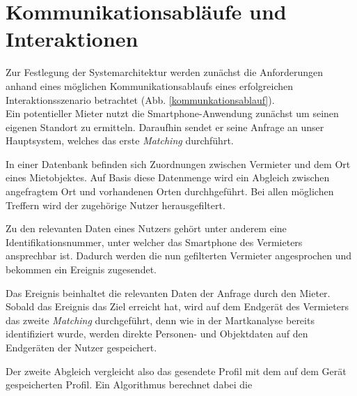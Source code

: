 
\section{Kommunikationsabläufe und Interaktionen}

Zur Festlegung der Systemarchitektur werden zunächst die Anforderungen anhand eines möglichen Kommunikationsablaufs eines erfolgreichen Interaktionsszenario betrachtet (Abb. \ref{kommunkationsablauf}).\\

Ein potentieller Mieter nutzt die Smartphone-Anwendung zunächst um seinen eigenen Standort zu ermitteln. Daraufhin sendet er seine Anfrage an unser Hauptsystem, welches das erste \textit{Matching} durchführt.

In einer Datenbank befinden sich Zuordnungen zwischen Vermieter und dem Ort eines Mietobjektes. Auf Basis diese Datenmenge wird ein Abgleich zwischen angefragtem Ort und vorhandenen Orten durchhgeführt. Bei allen möglichen Treffern wird der zugehörige Nutzer herausgefiltert.

Zu den relevanten Daten eines Nutzers gehört unter anderem eine Identifikationsnummer, unter welcher das Smartphone des Vermieters ansprechbar ist. Dadurch werden die nun gefilterten Vermieter angesprochen und bekommen ein Ereignis zugesendet.

Das Ereignis beinhaltet die relevanten Daten der Anfrage durch den Mieter. Sobald das Ereignis das Ziel erreicht hat, wird auf dem Endgerät des Vermieters das zweite \textit{Matching} durchgeführt, denn wie in der Martkanalyse bereits identifiziert wurde, werden direkte Personen- und Objektdaten auf den Endgeräten der Nutzer gespeichert.

Der zweite Abgleich vergleicht also das gesendete Profil mit dem auf dem Gerät gespeicherten Profil. Ein Algorithmus berechnet dabei die

